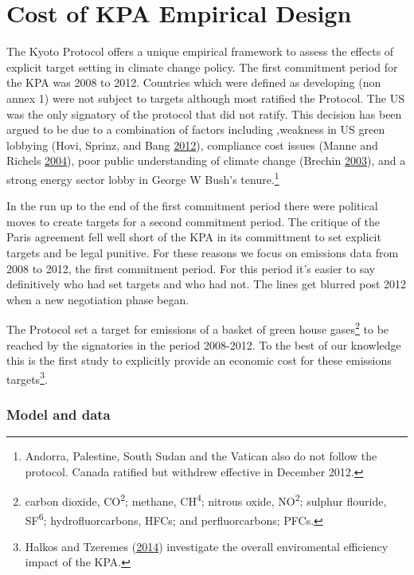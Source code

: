 \documentclass[12pt,]{article}
\begin{document}
\hypertarget{cost-of-kpa-empirical-design}{%
\section{Cost of KPA Empirical Design}\label{cost-of-kpa-empirical-design}}

The Kyoto Protocol offers a unique empirical framework to assess the effects of explicit target setting in climate change policy. The first commitment period for the KPA was 2008 to 2012. Countries which were defined as developing (non annex 1) were not subject to targets although most ratified the Protocol. The US was the only signatory of the protocol that did not ratify. This decision has been argued to be due to a combination of factors including ,weakness in US green lobbying (Hovi, Sprinz, and Bang \protect\hyperlink{ref-Hovi2012}{2012}), compliance cost issues (Manne and Richels \protect\hyperlink{ref-Manne2004}{2004}), poor public understanding of climate change (Brechin \protect\hyperlink{ref-Brechin2003}{2003}), and a strong energy sector lobby in George W Bush's tenure.\footnote{Andorra, Palestine, South Sudan and the Vatican also do not follow the protocol. Canada ratified but withdrew effective in December 2012.}

In the run up to the end of the first commitment period there were political moves to create targets for a second commitment period. The critique of the Paris agreement fell well short of the KPA in its committment to set explicit targets and be legal punitive. For these reasons we focus on emissions data from 2008 to 2012, the first commitment period. For this period it's easier to say definitively who had set targets and who had not. The lines get blurred post 2012 when a new negotiation phase began.

The Protocol set a target for emissions of a basket of green house gases\footnote{carbon dioxide, CO\textsuperscript{2}; methane, CH\textsuperscript{4}; nitrous oxide, NO\textsuperscript{2}; sulphur flouride, SF\textsuperscript{6}; hydrofluorcarbons, HFCs; and perfluorcarbons; PFCs.} to be reached by the signatories in the period 2008-2012. To the best of our knowledge this is the first study to explicitly provide an economic cost for these emissions targets\footnote{Halkos and Tzeremes (\protect\hyperlink{ref-Halkos2014}{2014}) investigate the overall enviromental efficiency impact of the KPA.}.

\hypertarget{model-and-data}{%
\subsubsection{Model and data}\label{model-and-data}}
\end{document}
